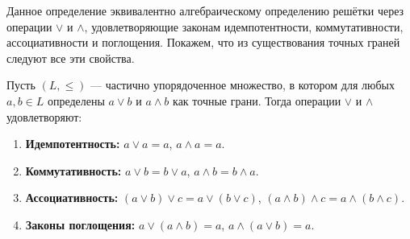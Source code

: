 \documentclass[10pt]{article}
\begin{document}
\begin{remark}
Данное определение эквивалентно алгебраическому определению решётки через операции $\vee$ и $\wedge$, удовлетворяющие законам идемпотентности, коммутативности, ассоциативности и поглощения. Покажем, что из существования точных граней следуют все эти свойства.
\end{remark}

\begin{stat}
Пусть $(L, \le)$ — частично упорядоченное множество, в котором для любых $a, b \in L$ определены $a \vee b$ и $a \wedge b$ как точные грани. Тогда операции $\vee$ и $\wedge$ удовлетворяют:
\begin{enumerate}
    \item \textbf{Идемпотентность:} $a \vee a = a$, $a \wedge a = a$.
    \item \textbf{Коммутативность:} $a \vee b = b \vee a$, $a \wedge b = b \wedge a$.
    \item \textbf{Ассоциативность:} $(a \vee b) \vee c = a \vee (b \vee c)$, $(a \wedge b) \wedge c = a \wedge (b \wedge c)$.
    \item \textbf{Законы поглощения:} $a \vee (a \wedge b) = a$, $a \wedge (a \vee b) = a$.
\end{enumerate}
\end{stat}
\end{document}
